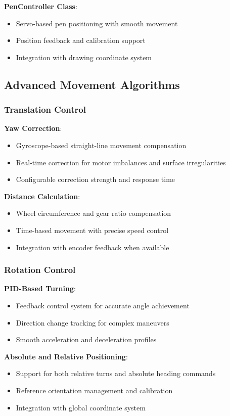 \textbf{PenController Class}:
\begin{itemize}
    \item Servo-based pen positioning with smooth movement
    \item Position feedback and calibration support
    \item Integration with drawing coordinate system
\end{itemize}

\subsection{Advanced Movement Algorithms}

\subsubsection{Translation Control}
\textbf{Yaw Correction}:
\begin{itemize}
    \item Gyroscope-based straight-line movement compensation
    \item Real-time correction for motor imbalances and surface irregularities
    \item Configurable correction strength and response time
\end{itemize}

\textbf{Distance Calculation}:
\begin{itemize}
    \item Wheel circumference and gear ratio compensation
    \item Time-based movement with precise speed control
    \item Integration with encoder feedback when available
\end{itemize}

\subsubsection{Rotation Control}
\textbf{PID-Based Turning}:
\begin{itemize}
    \item Feedback control system for accurate angle achievement
    \item Direction change tracking for complex maneuvers
    \item Smooth acceleration and deceleration profiles
\end{itemize}

\textbf{Absolute and Relative Positioning}:
\begin{itemize}
    \item Support for both relative turns and absolute heading commands
    \item Reference orientation management and calibration
    \item Integration with global coordinate system
\end{itemize}

